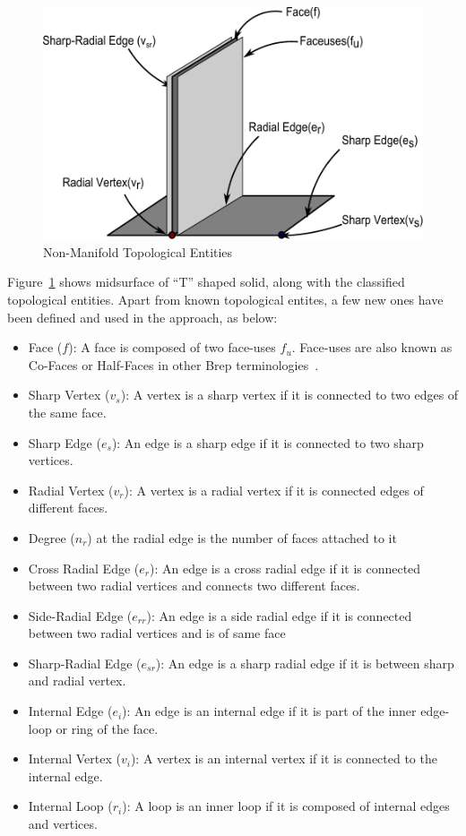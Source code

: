 
	\begin{figure}[!h]
	\centering     %
	\includegraphics[width=0.62\linewidth]{../Common/images/NonManifoldT2.pdf}
	\caption{Non-Manifold Topological Entities}
	\label{fig:topoval:nonmanifold}
	\end{figure}



Figure~\ref{fig:topoval:nonmanifold} shows midsurface of ``T'' shaped solid, along with the classified topological entities. Apart from known topological entites, a few new ones have been defined and used in the approach, as below:

\begin{itemize} 
[noitemsep,topsep=2pt,parsep=2pt,partopsep=2pt,label=\textbullet]\label{lst:topoval:topos}
\item Face ($f$): A face is composed of two face-uses $f_u$. Face-uses are also known as Co-Faces or Half-Faces in other Brep terminologies~\cite{Hegde2013}.

\item Sharp Vertex ($v_s$): A vertex is a sharp vertex if it is connected to two edges of the same face.
\item Sharp Edge ($e_s$): An edge is a sharp edge if it is connected to two sharp vertices.

\item Radial Vertex ($v_{r}$): A vertex is a radial vertex if it is connected edges of different faces.
\item Degree ($n_{r}$) at the radial edge is the number of faces attached to it 
\item Cross Radial Edge ($e_{r}$): An edge is a cross radial edge if it is connected between two radial vertices and connects two different faces.
\item Side-Radial  Edge ($e_{rr}$): An edge is a side radial edge if it is connected between two radial vertices and is of same face
\item Sharp-Radial Edge ($e_{sr}$): An edge is a sharp radial edge if it is between sharp and radial vertex.
\item Internal Edge ($e_i$): An edge is an internal edge if it is part of the inner edge-loop or ring of the face.
\item Internal Vertex ($v_i$): A vertex is an internal vertex if it is connected to the internal edge.
\item Internal Loop ($r_i$): A loop is an inner loop if it is composed of internal edges and vertices.
\end{itemize}


